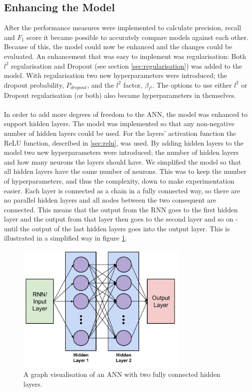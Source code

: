 \subsection{Enhancing the Model}\label{sect:enhacing_the_model}
\label{sec:enhacing_the_model}
After the performance measures were implemented to calculate precision, recall and $F_1$ score it became possible to accurately compare models against each other. Because of this, the model could now be enhanced and the changes could be evaluated. An enhancement that was easy to implement was regularisation: Both $l^2$ regularisation and Dropout (see section \ref{sec:regularisation}) was added to the model. With regularisation two new hyperparameters were introduced; the dropout probability, $P_{dropout}$, and the $l^2$ factor, $\beta_{l^2}$. The options to use either $l^2$ or Dropout regularisation (or both) also became hyperparameters in themselves.
\\\\
In order to add more degrees of freedom to the ANN, the model was enhanced to support hidden layers. The model was implemented so that any non-negative number of hidden layers could be used. For the layers' activation function the ReLU function, described in \ref{sec:relu}, was used. By adding hidden layers to the model two new hyperparameters were introduced; the number of hidden layers and how many neurons the layers should have. We simplified the model so that all hidden layers have the same number of neurons. This was to keep the number of hyperparameters, and thus the complexity, down to make experimentation easier. Each layer is connected as a chain in a fully connected way, so there are no parallel hidden layers and all nodes between the two consequent are connected. This means that the output from the RNN goes to the first hidden layer and the output from that layer then goes to the second layer and so on - until the output of the last hidden layers goes into the output layer. This is illustrated in a simplified way in figure \ref{fig:ann_hidden_layers}.
\begin{figure}[h!]
    \centering
    \includegraphics[width=0.75\textwidth]{figure/method/ann_hidden_layers}
    \caption{A graph visualisation of an ANN with two fully connected hidden layers.}
    \label{fig:ann_hidden_layers}
\end{figure}
